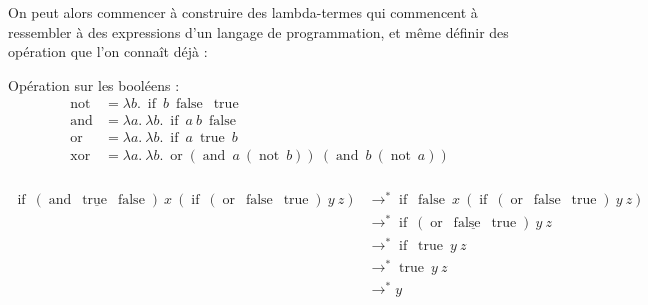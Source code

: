 \documentclass[11pt]{article}
\begin{document}
On peut alors commencer à construire des lambda-termes qui commencent à ressembler à des expressions d'un langage de programmation, et même définir des opération que l'on connaît déjà :
\begin{definition}
    Opération sur les booléens :
    \begin{equation*}
    \begin{aligned}
        \operatorname{not} &= \lambda b.~\operatorname{if}~b~\operatorname{false}~\operatorname{true}\\
        \operatorname{and} &= \lambda a. ~\lambda b.~ \operatorname{if}~a~b~\operatorname{false}\\
        \operatorname{or} &= \lambda a. ~\lambda b.~ \operatorname{if}~a~\operatorname{true}~b\\
        \operatorname{xor} &= \lambda a. ~\lambda b.~ \operatorname{or} \left(\operatorname{and}~a~\left(\operatorname{not}~b\right)\right) ~ \left(\operatorname{and}~b~\left(\operatorname{not}~a\right)\right)\\
    \end{aligned}
    \end{equation*}
\end{definition}

\begin{example}
    \begin{equation*}
    \begin{aligned}
        \operatorname{if}~\left(\underline{\operatorname{and}~\operatorname{true}~\operatorname{false}}\right)~x~\left(\operatorname{if}~\left(\operatorname{or}~\operatorname{false}~\operatorname{true}\right)~y~z\right)&\longrightarrow^*\operatorname{if}~\operatorname{false}~x~\left(\operatorname{if}~\left(\operatorname{or}~\operatorname{false}~\operatorname{true}\right)~y~z\right)\\
        &\longrightarrow^*\operatorname{if}~\left(\underline{\operatorname{or}~\operatorname{false}~\operatorname{true}}\right)~y~z\\
        &\longrightarrow^*\operatorname{if}~\operatorname{true}~y~z\\
        &\longrightarrow^*\operatorname{true}~y~z\\
        &\longrightarrow^*y
    \end{aligned}
    \end{equation*}
\end{example}
\end{document}
